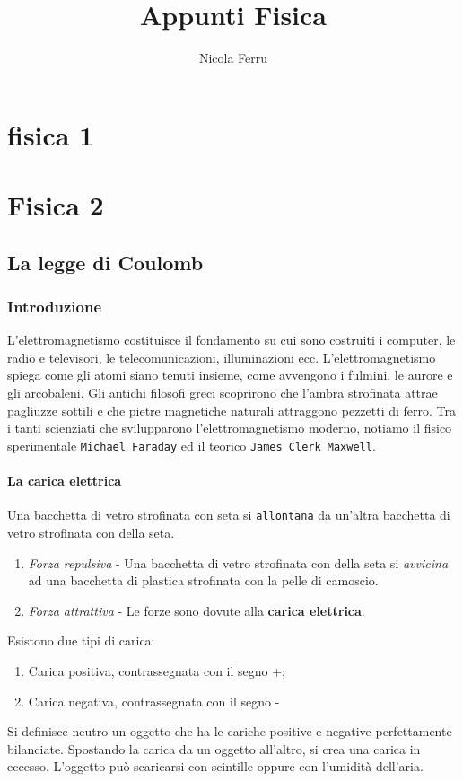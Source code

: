 \documentclass{book}
\title{Appunti Fisica}
\author{Nicola Ferru}
\date{}
\begin{document}
\maketitle
\tableofcontents
\listoftables
\listoffigures


\part{fisica 1}



\part {Fisica 2}

\chapter{La legge di Coulomb}
\section{Introduzione}
L'elettromagnetismo costituisce il fondamento su cui sono costruiti i computer,
le radio e televisori, le telecomunicazioni, illuminazioni ecc.
L'elettromagnetismo spiega come gli atomi siano tenuti insieme, come
avvengono i fulmini, le aurore e gli arcobaleni. Gli antichi filosofi greci
scoprirono che l'ambra strofinata attrae pagliuzze sottili e che pietre
magnetiche naturali attraggono pezzetti di ferro. Tra i tanti scienziati che
svilupparono l'elettromagnetismo moderno, notiamo il fisico sperimentale
\texttt{Michael Faraday} ed il teorico \texttt{James Clerk Maxwell}.
\subsection{La carica elettrica}
Una bacchetta di vetro strofinata con seta si \texttt{allontana} da un'altra
bacchetta di vetro strofinata con della seta.
\begin{enumerate}
	\item \textit{Forza repulsiva} - Una bacchetta di vetro strofinata con
		della seta si \textit{avvicina} ad una bacchetta di plastica strofinata
		con la pelle di camoscio.
	\item \textit{Forza attrattiva} - Le forze sono dovute alla \textbf{carica
		elettrica}.
\end{enumerate}
Esistono due tipi di carica:
\begin{enumerate}
	\item Carica positiva, contrassegnata con il segno +;
	\item Carica negativa, contrassegnata con il segno -
\end{enumerate}
Si definisce neutro un oggetto che ha le cariche positive e negative
perfettamente bilanciate.
Spostando la carica da un oggetto all'altro, si crea una carica in eccesso.
L'oggetto può scaricarsi con scintille oppure con l'umidità dell'aria.
\end{document}
